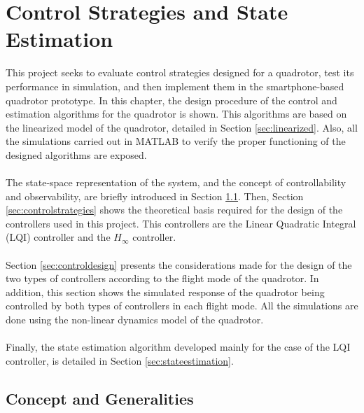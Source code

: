 \chapter{Control Strategies and State Estimation} \label{ch:controlandestimation}
This project seeks to evaluate control strategies designed for a quadrotor, test its performance in simulation, and then implement them in the smartphone-based quadrotor prototype. In this chapter, the design procedure of the control and estimation algorithms for the quadrotor is shown. This algorithms are based on the linearized model of the quadrotor, detailed in Section \ref{sec:linearized}. Also, all the simulations carried out in MATLAB to verify the proper functioning of the designed algorithms are exposed.
\\\\
The state-space representation of the system, and the concept of controllability and observability, are briefly introduced in Section \ref{sec:generalities}. Then, Section \ref{sec:controlstrategies} shows the theoretical basis required for the design of the controllers used in this project. This controllers are the Linear Quadratic Integral (LQI) controller and the $H_\infty$ controller.
\\\\
Section \ref{sec:controldesign} presents the considerations made for the design of the two types of controllers according to the flight mode of the quadrotor. In addition, this section shows the simulated response of the quadrotor being controlled by both types of controllers in each flight mode. All the simulations are done using the non-linear dynamics model of the quadrotor.
\\\\
Finally, the state estimation algorithm developed mainly for the case of the LQI controller, is detailed in Section \ref{sec:stateestimation}.

\section{Concept and Generalities}
\label{sec:generalities}

